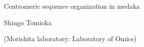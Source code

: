 \documentclass[a4paper, 11pt]{article}
\begin{document}
\begin{center}
{\Large Centromeric sequence organization in medaka}

\vspace{0.3cm}

{\large Shingo Tomioka}

\vspace{0.15cm}

{\large (Morishita laboratory: Laboratory of Omics)}
\end{center}

\vspace{0.7cm}


\end{document}
